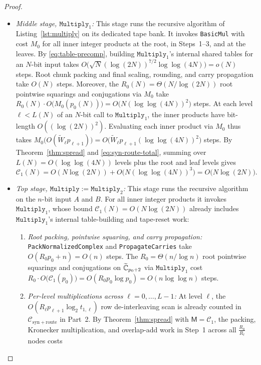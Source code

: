 \begin{proof}
\begin{itemize}[leftmargin=*]
  \[
    M_0(N) = O\bigl(N (\log(2N))^2\bigr).
  \]
  \item \emph{Middle stage, $\texttt{Multiply}_1$:} This stage runs the recursive algorithm of Listing~\ref{lst:multiply} on its dedicated tape bank. It invokes \texttt{BasicMul} with cost $M_0$ for all inner integer products at the root, in Steps~1--3, and at the leaves. By \eqref{eq:table-precomp}, building $\texttt{Multiply}_1$'s internal shared tables for an $N$-bit input takes $O\bigl(\sqrt{N}(\log(2N))^{7/2}\allowbreak\log\log(4N)\bigr) = o(N)$ steps. Root chunk packing and final scaling, rounding, and carry propagation take $O(N)$ steps. Moreover, the $R_0(N) = \Theta(N / \log(2N))$ root pointwise squarings and conjugations via $M_0$ take $R_0(N) \cdot O\bigl(M_0(p_0(N))\bigr) = O\bigl(N (\log \log(4N))^2\bigr)$ steps. At each level $\ell < L(N)$ of an $N$-bit call to $\texttt{Multiply}_1$, the inner products have bit-length $O((\log(2N))^2)$. Evaluating each inner product via $M_0$ thus takes $M_0\bigl(O(\tilde{W}_\ell p_{\ell+1})\bigr) = O\bigl(\tilde{W}_\ell p_{\ell+1} (\log \log(4N))^2\bigr)$ steps. By Theorem~\ref{thm:spread} and \eqref{eq:syn-route-total}, summing over $L(N) = O(\log \log(4N))$ levels plus the root and leaf levels gives
  \[
    \mathcal{C}_1(N) = O(N \log(2N)) + O\bigl(N (\log \log(4N))^3\bigr) = O\bigl(N \log(2N)\bigr).
  \]
  \item \emph{Top stage, $\texttt{Multiply} := \texttt{Multiply}_2$:} This stage runs the recursive algorithm on the $n$-bit input $A$ and $B$. For all inner integer products it invokes $\texttt{Multiply}_1$, whose bound $\mathcal{C}_1(N) = O(N \log(2N))$ already includes $\texttt{Multiply}_1$'s internal table-building and tape-reset work:
  \begin{enumerate}[label=(\alph*)]
    \item \emph{Root packing, pointwise squaring, and carry propagation:} \texttt{PackNormalizedComplex} and \texttt{PropagateCarries} take $O(R_0 p_0 + n) = O(n)$ steps. The $R_0 = \Theta(n / \log n)$ root pointwise squarings and conjugations on $\widetilde{\mathbb{C}}_{p_0+2}$ via $\texttt{Multiply}_1$ cost $R_0 \cdot O\bigl(\mathcal{C}_1(p_0)\bigr) = O(R_0 p_0 \log p_0) = O(n \log \log n)$ steps.
    \item \emph{Per-level multiplications across $\ell = 0, \dots, L-1$:} At level $\ell$, the $O(R_\ell p_{\ell+1}\log_2 t_{1,\ell})$ row de-interleaving scan is already counted in $\mathcal{C}_{\mathrm{syn+route}}$ in Part~2. By Theorem~\ref{thm:spread} with $\mathsf{M} = \mathcal{C}_1$, the packing, Kronecker multiplication, and overlap-add work in Step~1 across all $\frac{R_0}{R_\ell}$ nodes costs

\end{enumerate}
\end{itemize}
\end{proof}
